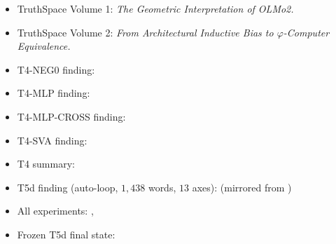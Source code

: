 \documentclass[
  twocolumn,
  10pt,
  a4paper]{article}
\providecommand{\tightlist}{%
  \setlength{\itemsep}{0pt}\setlength{\parskip}{0pt}}
\begin{document}
\begin{itemize}
\tightlist
\item
  TruthSpace Volume 1: \emph{The Geometric Interpretation of OLMo2.}
\item
  TruthSpace Volume 2: \emph{From Architectural Inductive Bias to
  \(\varphi\)-Computer Equivalence.}
\item
  T4-NEG0 finding: \texttt{}
\item
  T4-MLP finding: \texttt{}
\item
  T4-MLP-CROSS finding: \texttt{}
\item
  T4-SVA finding: \texttt{}
\item
  T4 summary: \texttt{}
\item
  T5d finding (auto-loop, \(1{,}438\) words, \(13\) axes):
  \texttt{} (mirrored from
  \texttt{})
\item
  All experiments: \texttt{},
  \texttt{}
\item
  Frozen T5d final state: \texttt{}
\end{itemize}
\end{document}
